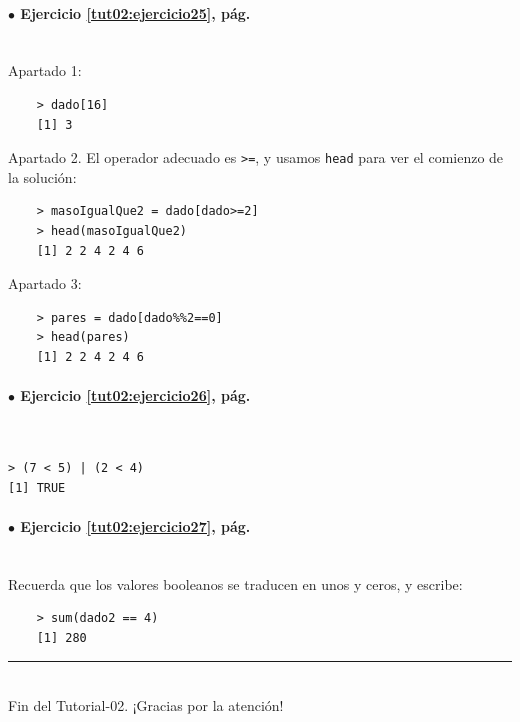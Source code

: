 \documentclass[10pt,a4paper]{article}\usepackage[]{graphicx}\usepackage[]{color}
\begin{document}
\paragraph{\bf $\bullet$ Ejercicio \ref{tut02:ejercicio25},  pág. \pageref{tut02:ejercicio25}}
\label{tut02:ejercicio25:sol}\quad\\
Apartado 1:
\begin{verbatim}
    > dado[16]
    [1] 3
\end{verbatim}
Apartado 2. El operador adecuado es {\tt >=}, y usamos {\tt head} para ver el comienzo de la solución:
\begin{verbatim}
    > masoIgualQue2 = dado[dado>=2]
    > head(masoIgualQue2)
    [1] 2 2 4 2 4 6
\end{verbatim}
Apartado 3:
\begin{verbatim}
    > pares = dado[dado%%2==0]
    > head(pares)
    [1] 2 2 4 2 4 6
\end{verbatim}

\paragraph{\bf $\bullet$ Ejercicio \ref{tut02:ejercicio26},  pág. \pageref{tut02:ejercicio26}}
\label{tut02:ejercicio26:sol}\quad\\

\begin{verbatim}
> (7 < 5) | (2 < 4)
[1] TRUE
\end{verbatim}


\paragraph{\bf $\bullet$ Ejercicio \ref{tut02:ejercicio27},  pág. \pageref{tut02:ejercicio27}}
\label{tut02:ejercicio27:sol}\quad\\

Recuerda que los valores booleanos se traducen en unos y ceros, y escribe:
\begin{verbatim}
    > sum(dado2 == 4)
    [1] 280
\end{verbatim}

\vspace{2cm} \hrule
\quad\\
Fin del Tutorial-02. ¡Gracias por la atención!
\end{document}
